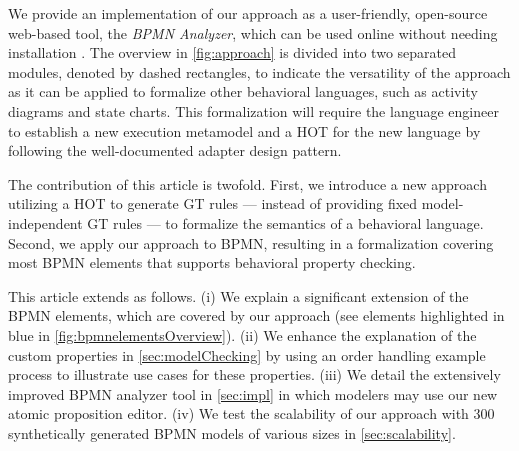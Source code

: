\documentclass{lmcs} %
\begin{document}
We provide an implementation of our approach as a user-friendly, open-source web-based tool, the \textit{BPMN Analyzer}, which can be used online without needing installation \cite{timkrauterLMCS2024Artifacts2023}.
The overview in \autoref{fig:approach} is divided into two separated modules, denoted by dashed rectangles, to indicate the versatility of the approach as it can be applied to formalize other behavioral languages, such as activity diagrams and state charts. %
This formalization will require the language engineer to establish a new execution metamodel and a HOT for the new language by following the well-documented adapter design pattern.


The contribution of this article is twofold.
First, we introduce a new approach utilizing a HOT to generate GT rules --- instead of providing fixed model-independent GT rules --- to formalize the semantics of a behavioral language.
Second, we apply our approach to BPMN, resulting in a formalization covering most BPMN elements that supports behavioral property checking.

This article extends \cite{krauterFormalizationAnalysisBPMN2023} as follows.
(i) We explain a significant extension of the BPMN elements, which are covered by our approach (see elements highlighted in blue in \autoref{fig:bpmnelementsOverview}).
(ii) We enhance the explanation of the custom properties in \autoref{sec:modelChecking} by using an order handling example process to illustrate use cases for these properties.
(iii) We detail the extensively improved BPMN analyzer tool in \autoref{sec:impl} in which modelers may use our new atomic proposition editor. %
(iv) We test the scalability of our approach with 300 synthetically generated BPMN models of various sizes in \autoref{sec:scalability}. 
\end{document}
